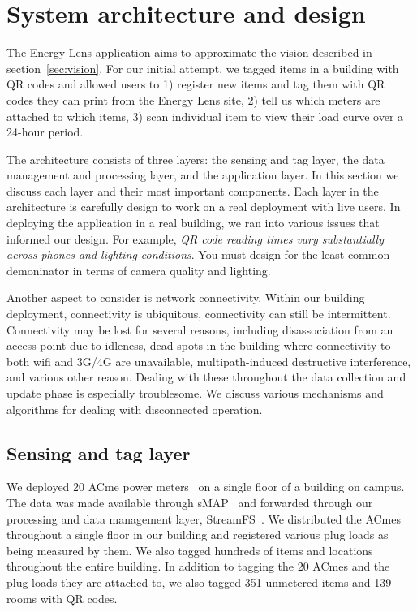 \section{System architecture and design}
The Energy Lens application aims to approximate the vision described in section~\ref{sec:vision}.  For our initial
attempt, we tagged items in a building with QR codes and allowed users to 1) register new items and tag
them with QR codes they can print from the Energy Lens site, 2) tell us which meters are attached to which items,
3) scan individual item to view their load curve over a 24-hour period.

The architecture consists of three layers: the sensing and tag layer, the data management and processing layer, and the application
layer.  In this section we discuss each layer and their most important components.  Each layer in the architecture
is carefully design to work on a real deployment with live users.  In deploying the application in a real building, we ran
into various issues that informed our design.  For example, \emph{QR code reading times vary substantially across phones
and lighting conditions}.  You must design for the least-common demoninator in terms of camera quality and lighting.

Another aspect to consider is network connectivity.  Within our building deployment, connectivity is ubiquitous, connectivity
can still be intermittent.  Connectivity may be lost for several reasons, including disassociation from an access point due
to idleness, dead spots in the building where connectivity to both wifi and 3G/4G are unavailable, multipath-induced
destructive interference, and various other reason.  Dealing with these throughout the data collection and update phase is
especially troublesome.  We discuss various mechanisms and algorithms for dealing with disconnected operation.

\subsection{Sensing and tag layer}
We deployed 20 ACme power meters~\cite{acme} on a single floor of a building on campus.  The data was made available through
sMAP~\cite{smap} and forwarded through our processing and data management layer, StreamFS~\cite{streamfs}.  We distributed
the ACmes throughout a single floor in our building and registered various plug loads as being measured by them.  We also tagged
hundreds of items and locations throughout the entire building.  In addition to tagging the 20 ACmes and the plug-loads they are
attached to, we also tagged 351 unmetered items and 139 rooms with QR codes.

